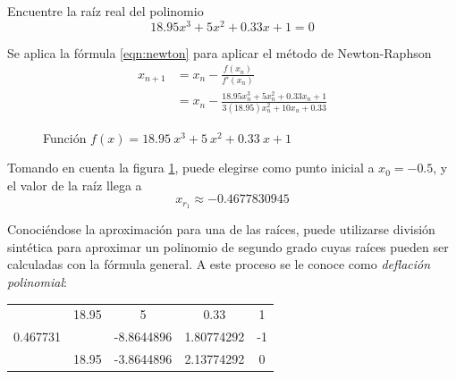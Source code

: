 \begin{ex}
    Encuentre la raíz real del polinomio 
    \[
        18.95x^3 + 5x^2  + 0.33x + 1 = 0
    \]

    \begin{solution}
        Se aplica la fórmula \ref{eqn:newton} para aplicar el método de
        Newton-Raphson
        \begin{align*}
            x_{n+1} &= x_n - \frac{f(x_n)}{f'(x_n)} \\
                &= x_n - \frac{18.95x_n^3 + 5x_n^2 + 0.33x_n +
                1}{3(18.95)x_n^2 + 10x_n + 0.33}
        \end{align*}

        \begin{figure}
            \centering
            \caption{Función $f(x) = 18.95\ x^3 + 5\ x^2 + 0.33\ x + 1$}
            \label{fig:ejercicio-newton-2}
        \end{figure}

        Tomando en cuenta la figura \ref{fig:ejercicio-newton-2}, puede
        elegirse como punto inicial a \(x_0 = -0.5 \), y el valor de la raíz
        llega a
        \[
            \boxed{x_{r_1} \approx -0.4677830945}
        \]

        Conociéndose la aproximación para una de las raíces, puede utilizarse
        división sintética para aproximar un polinomio de segundo grado cuyas
        raíces pueden ser calculadas con la fórmula general. A este proceso se
        le conoce como \textit{deflación polinomial}:

        \begin{center}
            \begin{tabular}{ c | c c c c }
                & 18.95 & 5 & 0.33 & 1 \\
                    0.467731 & & -8.8644896 & 1.80774292 & -1 \\
             \hline
                 & 18.95 & -3.8644896 & 2.13774292 & 0
            \end{tabular}
        \end{center}


\end{solution}
\end{ex}
